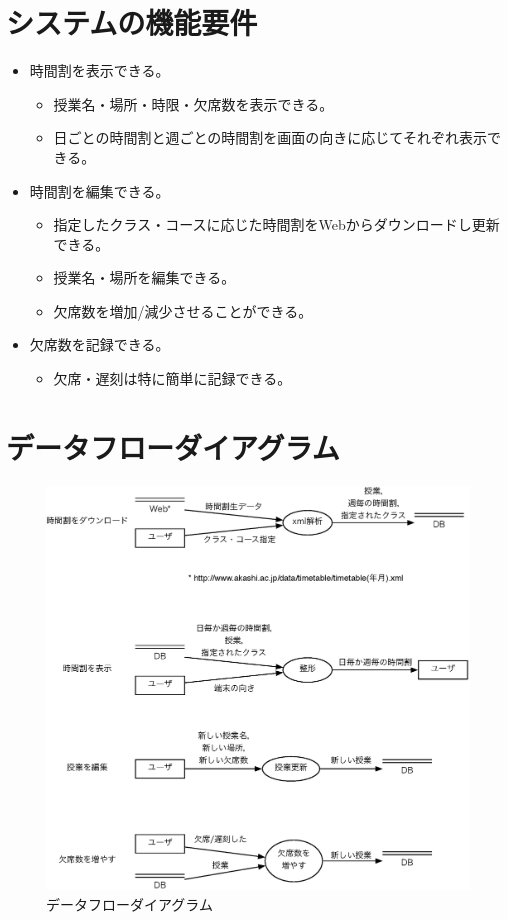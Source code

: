 \documentclass[a4paper,11pt]{jsarticle}
\begin{document}
\section{システムの機能要件}

\begin{itemize}
\item 時間割を表示できる。
	\begin{itemize}
	\item 授業名・場所・時限・欠席数を表示できる。
	\item 日ごとの時間割と週ごとの時間割を画面の向きに応じてそれぞれ表示できる。
	\end{itemize}
\item 時間割を編集できる。
	\begin{itemize}
	\item 指定したクラス・コースに応じた時間割をWebからダウンロードし更新できる。
	\item 授業名・場所を編集できる。
	\item 欠席数を増加/減少させることができる。
	\end{itemize}
\item 欠席数を記録できる。
	\begin{itemize}
	\item 欠席・遅刻は特に簡単に記録できる。
	\end{itemize}
\end{itemize}


\section{データフローダイアグラム}

\begin{figure}[htbp]
\centering
\includegraphics[width=170mm]{./DFD.eps}
\caption{データフローダイアグラム \label{img:dfd}}
\end{figure}
\end{document}
